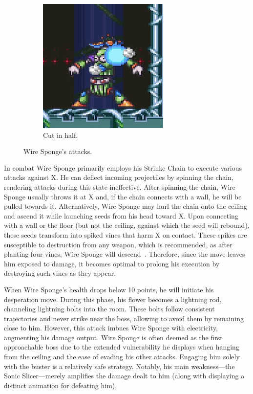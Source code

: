 \begin{figure}[htp]
\begin{subfigure}{0.35\linewidth}
		\includegraphics[width=\linewidth]{figures/X2/Wire_sponge/Sponge_cut.jpg}
		\caption{Cut in half.}
	\end{subfigure}
	\caption{Wire Sponge's attacks.}
\end{figure}
In combat Wire Sponge primarily employs his Strinke Chain to execute various attacks against X. He can deflect incoming projectiles by spinning the chain, rendering attacks during this state ineffective. After spinning the chain, Wire Sponge usually throws it at X and, if the chain connects with a wall, he will be pulled towards it. Alternatively, Wire Sponge may hurl the chain onto the ceiling and ascend it while launching seeds from his head toward X. Upon connecting with a wall or the floor (but not the ceiling, against which the seed will rebound), these seeds transform into spiked vines that harm X on contact. These spikes are susceptible to destruction from any weapon, which is recommended, as after planting four vines, Wire Sponge will descend~\cite{rta:x2}. Therefore, since the move leaves him exposed to damage, it becomes optimal to prolong his execution by destroying such vines as they appear.

When Wire Sponge's health drops below 10 points, he will initiate his desperation move. During this phase, his flower becomes a lightning rod, channeling lightning bolts into the room. These bolts follow consistent trajectories and never strike near the boss, allowing to avoid them by remaining close to him. However, this attack imbues Wire Sponge with electricity, augmenting his damage output. Wire Sponge is often deemed as the first approachable boss due to the extended vulnerability he displays when hanging from the ceiling and the ease of evading his other attacks. Engaging him solely with the buster is a relatively safe strategy. Notably, his main weakness—the Sonic Slicer—merely amplifies the damage dealt to him (along with displaying a distinct animation for defeating him).

